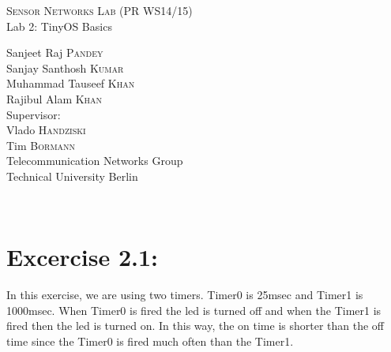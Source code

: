 \documentclass[11pt]{article} %
\begin{document}

\begin{titlepage}
\begin{center}


\newcommand{\HRule}{\rule{\linewidth}{0.5mm}} %


\vspace{30 mm}

\textsc{\large Sensor Networks Lab (PR WS14/15) }\\[1cm] %

{\huge Lab 2: TinyOS Basics} \\[1cm] %

\begin{minipage}{0.5\textwidth}
\begin{flushleft}
\center
Sanjeet Raj \textsc{Pandey}\\
Sanjay Santhosh \textsc{Kumar}\\
Muhammad Tauseef \textsc{Khan}\\
Rajibul Alam \textsc{Khan}\\[2cm]

Supervisor: \\
Vlado \textsc{Handziski}\\ 
Tim \textsc{Bormann} \\
\vspace{30 mm}
Telecommunication Networks Group\\
Technical University Berlin\\ 

\end{flushleft}
\end{minipage} \\[1cm]
\end{center}

\vspace{30 mm}
\end{titlepage}

\section*{Excercise 2.1:}
In this exercise, we are using two timers. Timer0 is 25msec and Timer1 is 1000msec. When Timer0 is fired the led is turned off and when the Timer1 is fired then the led is turned on. In this way, the on time is shorter than the off time since the Timer0 is fired much often than the Timer1.
\end{document}
